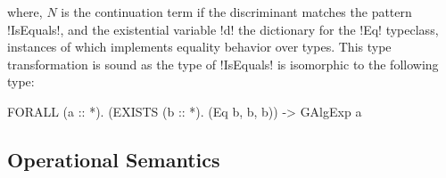 \documentclass[screen,nonacm]{acmart}
\begin{document}
where, $N$ is the continuation term if the discriminant matches the pattern
!IsEquals!, and the existential variable !d! the dictionary for the !Eq!
typeclass, instances of which implements equality behavior over types.
This type transformation is sound as the type of !IsEquals! is
isomorphic to the following type:

\begin{CenteredBox}
\begin{code}
FORALL (a :: *). (EXISTS (b :: *). (Eq b, b, b)) -> GAlgExp a
\end{code}
\end{CenteredBox}

\subsection{Operational Semantics}\label{sec:sfc-op-sem}
\newcommand{\Beta}{
 \ib{\irule[\trule{$\beta$}]
 {};
 {$\stepsto {(\Lam {x\co\tau} M) \App N} {\Set{x\mapsto N}M}$}
 }
}
\newcommand{\TBeta}{
 \ib{\irule[\trule{Ty-$\beta$}]
 {};
 {$\stepsto {(\TLam \TyVar M) \App \tau} {\Set{\TyVar\mapsto \tau}M}$}
 }
}
\newcommand{\CaseE}{
 \ib{\irule[\trule{case}]
 {};
 {\stepsto {\Case {(K \many\sigma\many\phi\many\Tm)} {\Set{...; K\App\many\beta\App\many x \to N; ...}}} {\Set{\many {\beta\mapsto\phi}, \many{x\mapsto\Tm}}N}}
 }
}
\newcommand{\CoTransE}{
 \ib{\irule[\trule{Co-Trans}]
 {};
 {$\stepsto {\Cast {(\Cast \Val \Co)} {\nu}} {\Cast \Val {(\trans{\Co} {\nu})}}$}
 }
}

\newcommand{\TyPush}{
 \ib{\irule[\trule{ty-push}];
 {$\stepsto {(\Cast{\TLam {\TyVar\co\kappa} M}\Co)\App \tau} {({\TLam {\TyVar\co\kappa} (\Cast M {\Co\At\TyVar})})\App \tau}$}
 }
}

\newcommand{\CoPush}{
 \ib{\irule[\trule{co-push}]
 {\substack {\mathlarger{\nu\co \sigma_1' \sim \sigma_2'}\\
 \mathlarger{\Co_1 : \sigma_1 \sim \sigma_1' = \Left {(\Left \Co)}}}}
 {\substack {\mathlarger{\Co\co (\sigma_1 \sim \sigma_2 \then \sigma_3) \sim (\sigma_1' \sim \sigma_2' \then \sigma_3')}\\
 \mathlarger{{\Co_2: \sigma_2 \sim \sigma_2' = \Right{(\Left\Co)}\quad{\Co_3:\sigma_3\sim\sigma_3' = \Right\Co}}}}};
 {$\stepsto {(\Cast{\TLam {\TyVar\co(\sigma_1\sim\sigma_2)} M}\Co)\App \nu} {\Cast {(\TLam {\TyVar\co(\sigma_1\sim\sigma_2)} M)\App (\Co_1 \circ \nu \circ \Sym \Co_2)} {\Co_3}} $}
 }
}

\newcommand{\Push}{
 \ib{\irule[\trule{push}]
 {\Co : \tau_1 \to \tau_2 \sim \tau_1' \to \tau_2'}
 {\Co_1 = \Right (\Left \Co)}
 {\Co_2 = \Right \Co};
 {$\stepsto {({\Cast {\Lam x M} {\Co}}) \App N} {\Cast {(({\Lam x M})\App {(\Cast N {\Sym \Co_1})})} \Co_2}$}
 }
}
\end{document}
